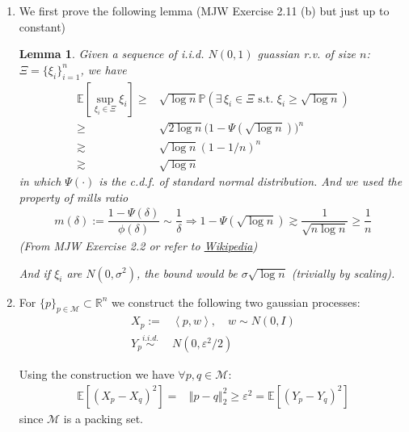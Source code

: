 \documentclass[11pt,a4paper]{article}
\newtheorem{lemma}[theorem]{Lemma}
\numberwithin{equation}{section}%
\begin{document}
\begin{enumerate}[topsep=2pt,itemsep=2pt]
    \item We first prove the following lemma (MJW Exercise 2.11 (b) but just up to constant)
        \begin{lemma}\label{lem:1}
        Given a sequence of i.i.d. $ N(0,1) $ guassian r.v. of size $ n $: $ \Xi=\{\xi _i\}_{i=1}^n $, we have
        \begin{align*}
            \mathbb{E}\left[ \sup_{\xi _i\in\Xi} \xi _i \right] \geq & \sqrt{\log n} \mathbb{P}\left( \exists\, \xi _i\in \Xi\text{ s.t. }\xi _i \geq \sqrt{\log n} \right) \\
            \geq & \sqrt{2\log n}\big( 1- \Psi(\sqrt{\log n}) \big) ^n\\
            \gtrsim & \sqrt{\log n}(1-1/n)^n \\
            \gtrsim & \sqrt{\log n}
        \end{align*}
        in which $ \Psi(\cdot) $ is the c.d.f. of standard normal distribution. And we used the property of mills ratio 
        \begin{align*}
            m(\delta ) := \dfrac{ 1-\Psi(\delta ) }{ \phi (\delta ) } \sim \dfrac{ 1 }{ \delta  }    \Rightarrow 1-\Psi(\sqrt{\log n}) \gtrsim \dfrac{ 1 }{ \sqrt{n\log n} } \geq \dfrac{ 1 }{ n }  
        \end{align*}
        (From MJW Exercise 2.2 or refer to \href{https://en.wikipedia.org/wiki/Mills_ratio}{Wikipedia})

        And if $ \xi _i $ are $ N(0,\sigma ^2) $, the bound would be $ \sigma \sqrt{\log n} $ (trivially by scaling).
        \end{lemma}
    \item  For $ \{p\}_{p\in \mathcal{M}}\subset \mathbb{R}^n $ we construct the following two gaussian processes:
    \begin{align*}
        X_p := & \left\langle p,w \right\rangle ,\quad w\sim N(0,I)\\
        Y_p \mathop{ \sim }\limits^{i.i.d.} & N(0,\varepsilon ^2/2)
    \end{align*}

    Using the construction we have $ \forall p,q \in \mathcal{M} $:
    \begin{align*}
        \mathbb{E}\left[ (X_p-X_q)^2 \right] = & \left\Vert p-q \right\Vert _2^2 \geq \varepsilon ^2 = \mathbb{E}\left[ (Y_p-Y_q)^2 \right]      
    \end{align*}
    since $ \mathcal{M} $ is a packing set. 


\end{enumerate}
\end{document}
